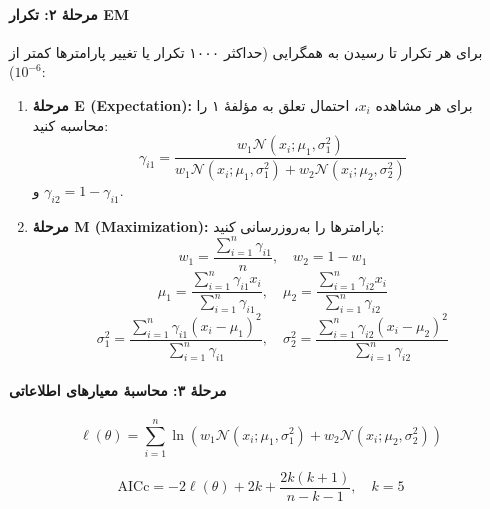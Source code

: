 \documentclass[a4paper,12pt]{article}
\begin{document}
\paragraph{مرحلهٔ ۲: تکرار EM}

برای هر تکرار تا رسیدن به همگرایی (حداکثر ۱۰۰۰ تکرار یا تغییر پارامترها کمتر از $10^{-6}$):

\begin{enumerate}
\item \textbf{مرحلهٔ E (Expectation):} برای هر مشاهده $x_i$، احتمال تعلق به مؤلفهٔ ۱ را محاسبه کنید:
\begin{equation}
\gamma_{i1} = \frac{w_1 \mathcal{N}(x_i; \mu_1, \sigma_1^2)}{w_1 \mathcal{N}(x_i; \mu_1, \sigma_1^2) + w_2 \mathcal{N}(x_i; \mu_2, \sigma_2^2)}
\end{equation}
و $\gamma_{i2} = 1 - \gamma_{i1}$.

\item \textbf{مرحلهٔ M (Maximization):} پارامترها را به‌روزرسانی کنید:
\begin{equation}
w_1 = \frac{\sum_{i=1}^{n} \gamma_{i1}}{n}, \quad w_2 = 1 - w_1
\end{equation}
\begin{equation}
\mu_1 = \frac{\sum_{i=1}^{n} \gamma_{i1} x_i}{\sum_{i=1}^{n} \gamma_{i1}}, \quad \mu_2 = \frac{\sum_{i=1}^{n} \gamma_{i2} x_i}{\sum_{i=1}^{n} \gamma_{i2}}
\end{equation}
\begin{equation}
\sigma_1^2 = \frac{\sum_{i=1}^{n} \gamma_{i1} (x_i - \mu_1)^2}{\sum_{i=1}^{n} \gamma_{i1}}, \quad \sigma_2^2 = \frac{\sum_{i=1}^{n} \gamma_{i2} (x_i - \mu_2)^2}{\sum_{i=1}^{n} \gamma_{i2}}
\end{equation}
\end{enumerate}

\paragraph{مرحلهٔ ۳: محاسبهٔ معیارهای اطلاعاتی}

\begin{equation}
\ell(\theta) = \sum_{i=1}^{n} \ln\left(w_1 \mathcal{N}(x_i; \mu_1, \sigma_1^2) + w_2 \mathcal{N}(x_i; \mu_2, \sigma_2^2)\right)
\end{equation}

\begin{equation}
\text{AICc} = -2\ell(\theta) + 2k + \frac{2k(k+1)}{n-k-1}, \quad k = 5
\end{equation}
\end{document}

